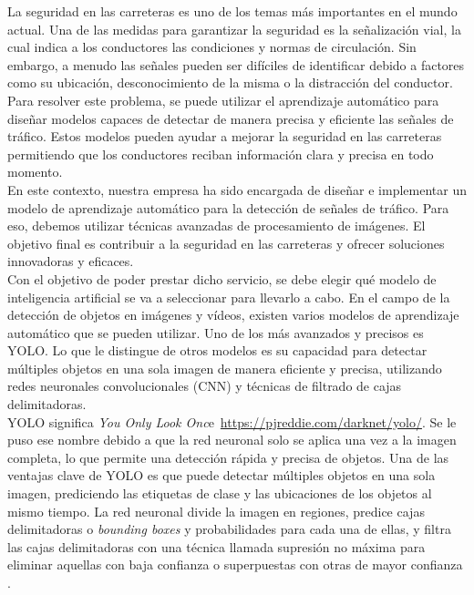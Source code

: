La seguridad en las carreteras es uno de los temas más importantes en el mundo actual. Una de las medidas para garantizar la seguridad es la señalización vial, la cual indica a los conductores las condiciones y normas de circulación. Sin embargo, a menudo las señales pueden ser difíciles de identificar debido a factores como su ubicación, desconocimiento de la misma o la distracción del conductor.\\

Para resolver este problema, se puede utilizar el aprendizaje automático para diseñar modelos capaces de detectar de manera precisa y eficiente las señales de tráfico. Estos modelos pueden ayudar a mejorar la seguridad en las carreteras permitiendo que los conductores reciban información clara y precisa en todo momento.\\

En este contexto, nuestra empresa ha sido encargada de diseñar e implementar un modelo de aprendizaje automático para la detección de señales de tráfico. Para eso, debemos utilizar técnicas avanzadas de procesamiento de imágenes. El objetivo final es contribuir a la seguridad en las carreteras y ofrecer soluciones innovadoras y eficaces.\\

Con el objetivo de poder prestar dicho servicio, se debe elegir qué modelo de inteligencia artificial se va a seleccionar para llevarlo a cabo. En el campo de la detección de objetos en imágenes y vídeos, existen varios modelos de aprendizaje automático que se pueden utilizar. Uno de los más avanzados y precisos es YOLO. Lo que le distingue de otros modelos es su capacidad para detectar múltiples objetos en una sola imagen de manera eficiente y precisa, utilizando redes neuronales convolucionales (CNN) y técnicas de filtrado de cajas delimitadoras. \\

YOLO significa \textit{You Only Look Onc}e\  \url{https://pjreddie.com/darknet/yolo/}. Se le puso ese nombre debido a que la red neuronal solo se aplica una vez a la imagen completa, lo que permite una detección rápida y precisa de objetos. Una de las ventajas clave de YOLO es que puede detectar múltiples objetos en una sola imagen, prediciendo las etiquetas de clase y las ubicaciones de los objetos al mismo tiempo. La red neuronal divide la imagen en regiones, predice cajas delimitadoras o \textit{bounding boxes} y probabilidades para cada una de ellas, y filtra las cajas delimitadoras con una técnica llamada supresión no máxima para eliminar aquellas con baja confianza o superpuestas con otras de mayor confianza \cite{yolo1}.\\

